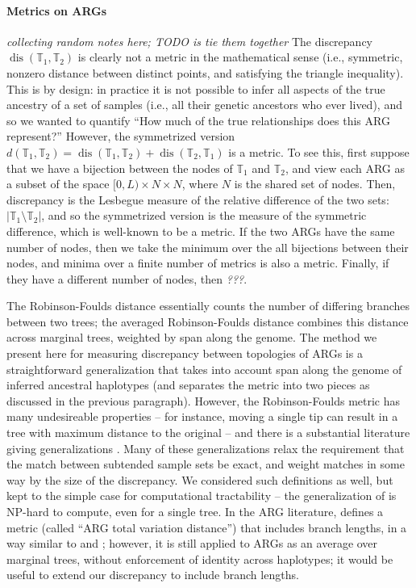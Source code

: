 \documentclass[10pt,twoside,lineno]{gsajnl}
\newcommand{\T}{\mathbb{T}}
\newcommand{\dis}{\operatorname{dis}}
\newcommand{\comment}[1]{{\color{violet} \it #1}}
\begin{document}
\paragraph{Metrics on ARGs}
\comment{collecting random notes here; TODO is tie them together}
The discrepancy $\dis(\T_1,\T_2)$ is clearly not a metric in the mathematical sense
(i.e., symmetric, nonzero distance between distinct points, and satisfying the triangle inequality).
This is by design: in practice it is not possible to infer all aspects
of the true ancestry of a set of samples (i.e., all their genetic ancestors who ever lived),
and so we wanted to quantify
``How much of the true relationships does this ARG represent?''
However, the symmetrized version
$d(\T_1,\T_2) = \dis(\T_1,\T_2) + \dis(\T_2, \T_1)$ is a metric.
To see this, first suppose that we have a bijection between the nodes of $\T_1$ and $\T_2$,
and view each ARG as a subset of the space $[0,L) \times N \times N$,
where $N$ is the shared set of nodes.
Then, discrepancy is the Lesbegue measure of the relative difference of the two sets:
$|\T_1 \setminus \T_2|$,
and so the symmetrized version is the measure of the symmetric difference,
which is well-known to be a metric.
If the two ARGs have the same number of nodes,
then we take the minimum over the all bijections between their nodes,
and minima over a finite number of metrics is also a metric.
Finally, if they have a different number of nodes,
then \comment{???}.

The Robinson-Foulds distance \citep{robinson1981comparison}
essentially counts the number of differing branches between two trees;
the averaged Robinson-Foulds distance \citep{kelleher2019inferring} %
combines this distance across marginal trees, weighted by span along the genome.
The method we present here for measuring discrepancy between topologies of ARGs
is a straightforward generalization
that takes into account span along the genome of inferred ancestral haplotypes
(and separates the metric into two pieces as discussed in the previous paragraph).
However, the Robinson-Foulds metric has many undesireable properties --
for instance, moving a single tip can result in a tree with maximum distance to the original --
and there is a substantial literature giving generalizations
\citep[reviewed by][]{llabres2021generalized}.
Many of these generalizations \citep[e.g.,][]{bocker2013generalized}
relax the requirement that the match between subtended sample sets be exact,
and weight matches in some way by the size of the discrepancy.
We considered such definitions as well, but kept to the simple case
for computational tractability --
the generalization of \citet{bocker2013generalized} is NP-hard to compute, even for a single tree.
In the ARG literature, \citet{zhang2023biobankscale}
defines a metric (called ``ARG total variation distance'') that includes branch lengths,
in a way similar to \citet{robinson1979comparison} and \citet{kuhner1994simulation};
however, it is still applied to ARGs as an average over marginal trees,
without enforcement of identity across haplotypes;
it would be useful to extend our discrepancy to include branch lengths.
\end{document}
